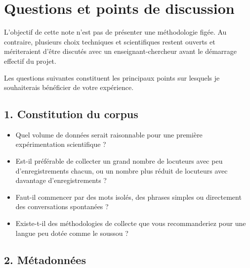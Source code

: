 \section{Questions et points de discussion}

L'objectif de cette note n'est pas de présenter une méthodologie figée.
Au contraire, plusieurs choix techniques et scientifiques restent ouverts
et mériteraient d'être discutés avec un enseignant-chercheur avant le
démarrage effectif du projet.

Les questions suivantes constituent les principaux points sur lesquels
je souhaiterais bénéficier de votre expérience.


\subsection{1. Constitution du corpus}

\begin{discussion}

\begin{itemize}

\item Quel volume de données serait raisonnable pour une première
expérimentation scientifique ?

\item Est-il préférable de collecter un grand nombre de locuteurs avec
peu d'enregistrements chacun, ou un nombre plus réduit de locuteurs avec
davantage d'enregistrements ?

\item Faut-il commencer par des mots isolés, des phrases simples ou
directement des conversations spontanées ?

\item Existe-t-il des méthodologies de collecte que vous recommanderiez
pour une langue peu dotée comme le soussou ?

\end{itemize}

\end{discussion}


\subsection{2. Métadonnées}

